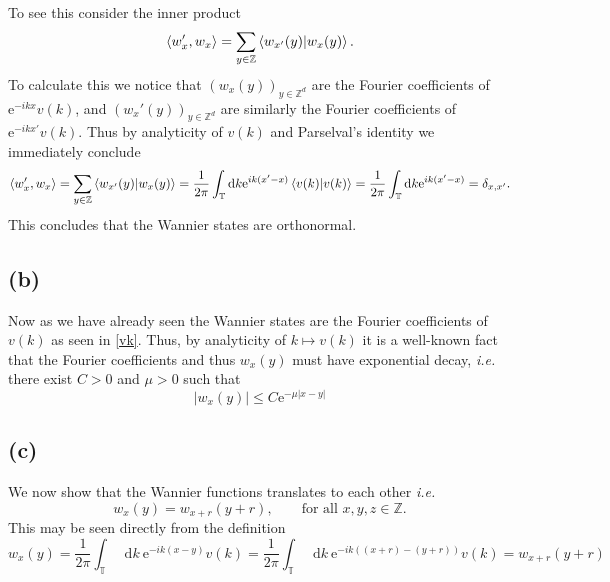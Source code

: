 \documentclass[a4paper,11pt]{article}
\newcommand{\euler}[1]{\text{e}^{#1}}
\newcommand{\abs}[1]{\left\lvert #1 \right\rvert}
\newcommand*\diff{\mathop{}\!\mathrm{d}}
\newcommand{\Z}{\mathbb{Z}}
\numberwithin{equation}{section}
\begin{document}
 	 To see this consider the inner product \begin{equation}
 	 \braket{w_x',w_x}=\sum_{y\in \Z}\braket{w_{x'}(y)|w_x(y)}.
 	 \end{equation}
 	 To calculate this we notice that $( w_x(y))_{y\in\Z^d} $ are the Fourier coefficients of $ \euler{-ikx}v(k) $, and $ (w_x'(y))_{y\in\Z^d} $ are similarly the Fourier coefficients of $ \euler{-ikx'}v(k) $. Thus by analyticity of $ v(k) $ and Parselval's identity we immediately conclude \begin{equation}
 	 \braket{w_x',w_x}=\sum_{y\in \Z}\braket{w_{x'}(y)|w_x(y)}=\frac{1}{2\pi}\int_{\mathbb{T}} \diff k \euler{ik(x'-x)}\braket{v(k)|v(k)}=\frac{1}{2\pi}\int_{\mathbb{T}}\diff k\euler{ik(x'-x)}=\delta_{x,x'}.
 	 \end{equation} 
 	 This concludes that the Wannier states are orthonormal.
 	 \subsection*{(b)}
 	 Now as we have already seen the Wannier states are the Fourier coefficients of $ v(k) $ as seen in \eqref{vk}. Thus, by analyticity of $ k\mapsto v(k) $ it is a well-known fact that the Fourier coefficients and thus $ w_x(y) $ must have exponential decay, \emph{i.e.} there exist $ C>0 $ and $ \mu>0 $ such that\begin{equation}
 	 \abs{w_x(y)}\leq C\euler{-\mu|x-y|}
 	 \end{equation} 
 	 \subsection*{(c)}
 	 We now show that the Wannier functions translates to each other \emph{i.e.} \begin{equation}
 	 w_{x}(y)=w_{x+r}(y+r),\qquad \text{for all }x,y,z\in\Z.
 	 \end{equation}
 	 This may be seen directly from the definition \begin{equation}
 	 w_{x}(y)=\frac{1}{2\pi}\int_{\mathbb{T}}\diff k\ \euler{-ik(x-y)}v(k)=\frac{1}{2\pi}\int_{\mathbb{T}}\diff k\ \euler{-ik((x+r)-(y+r))}v(k)=w_{x+r}(y+r)
 	 \end{equation}
\end{document}
